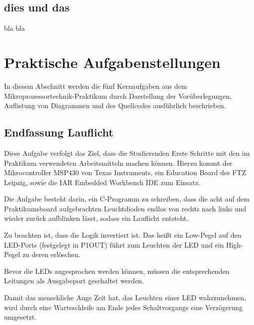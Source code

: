\documentclass[12pt,a4paper,bibliography=totocnumbered,listof=totocnumbered]{scrartcl}
\begin{document}
\subsection{dies und das}
bla bla

\pagebreak


\section{Praktische Aufgabenstellungen}

In diesem Abschnitt werden die fünf Kernaufgaben aus dem Mikroprozessortechnik-Praktikum durch Darstellung der Vorüberlegungen, Auflistung von Diagrammen und des Quellcodes ausführlich beschrieben.

\subsection{Endfassung Lauflicht}
Diese Aufgabe verfolgt das Ziel, dass die Studierenden Erste Schritte mit den im Praktikum verwendeten Arbeitsmitteln machen können.
Hierzu kommt der Mikrocontroller MSP430 von Texas Instruments, ein Education Board des FTZ Leipzig, sowie die IAR Embedded Workbench IDE zum Einsatz.

Die Aufgabe besteht darin, ein C-Programm zu schreiben, dass die acht auf dem Praktikumsboard aufgebrachten Leuchtdioden endlos von rechts nach links und wieder zurück aufblinken lässt, sodass ein Lauflicht entsteht.

Zu beachten ist, dass die Logik invertiert ist. Das heißt ein Low-Pegel auf den LED-Ports (festgelegt in P1OUT) führt zum Leuchten der LED und ein High-Pegel zu deren erlöschen.

Bevor die LEDs angesprochen werden können, müssen die entsprechenden Leitungen als Ausgabeport geschaltet werden.

\vspace{1em}


Damit das menschliche Auge Zeit hat, das Leuchten einer LED wahrzunehmen, wird durch eine Warteschleife am Ende jedes Schaltvorgangs eine Verzögerung umgesetzt.
\end{document}
